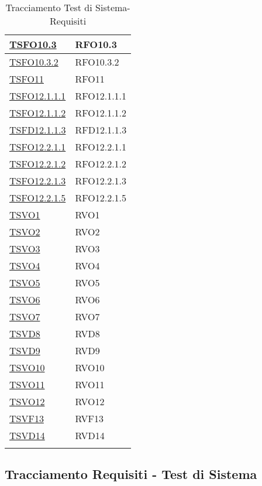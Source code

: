 \begin{longtable}{|>{\centering}m{5cm}|m{5cm}<{\centering}|}
	\hyperlink{TSFO10.3}{TSFO10.3} & RFO10.3\\ \hline
	\hyperlink{TSFO10.3.2}{TSFO10.3.2} & RFO10.3.2\\ \hline
	\hyperlink{TSFO11}{TSFO11} & RFO11\\ \hline
	\hyperlink{TSFO12.1.1.1}{TSFO12.1.1.1} & RFO12.1.1.1\\ \hline
	\hyperlink{TSFO12.1.1.2}{TSFO12.1.1.2} & RFO12.1.1.2\\ \hline
	\hyperlink{TSFD12.1.1.3}{TSFD12.1.1.3} & RFD12.1.1.3\\ \hline
	\hyperlink{TSFO12.2.1.1}{TSFO12.2.1.1} & RFO12.2.1.1\\ \hline
	\hyperlink{TSFO12.2.1.2}{TSFO12.2.1.2} & RFO12.2.1.2\\ \hline
	\hyperlink{TSFO12.2.1.3}{TSFO12.2.1.3} & RFO12.2.1.3\\ \hline
	\hyperlink{TSFO12.2.1.5}{TSFO12.2.1.5} & RFO12.2.1.5\\ \hline
	\hyperlink{TSVO1}{TSVO1} & RVO1\\ \hline
	\hyperlink{TSVO2}{TSVO2} & RVO2\\ \hline
	\hyperlink{TSVO3}{TSVO3} & RVO3\\ \hline
	\hyperlink{TSVO4}{TSVO4} & RVO4\\ \hline
	\hyperlink{TSVO5}{TSVO5} & RVO5\\ \hline
	\hyperlink{TSVO6}{TSVO6} & RVO6\\ \hline
	\hyperlink{TSVO7}{TSVO7} & RVO7\\ \hline
	\hyperlink{TSVD8}{TSVD8} & RVD8\\ \hline
	\hyperlink{TSVD9}{TSVD9} & RVD9\\ \hline
	\hyperlink{TSVO10}{TSVO10} & RVO10\\ \hline
	\hyperlink{TSVO11}{TSVO11} & RVO11\\ \hline
	\hyperlink{TSVO12}{TSVO12} & RVO12\\ \hline
	\hyperlink{TSVF13}{TSVF13} & RVF13\\ \hline
	\hyperlink{TSVD14}{TSVD14} & RVD14\\ \hline	
	\caption[Tracciamento Test di Sistema-Requisiti]{Tracciamento Test di Sistema-Requisiti}
	\label{tabella:ts-requi}
\end{longtable}
\clearpage

\subsection{Tracciamento Requisiti - Test di Sistema}

